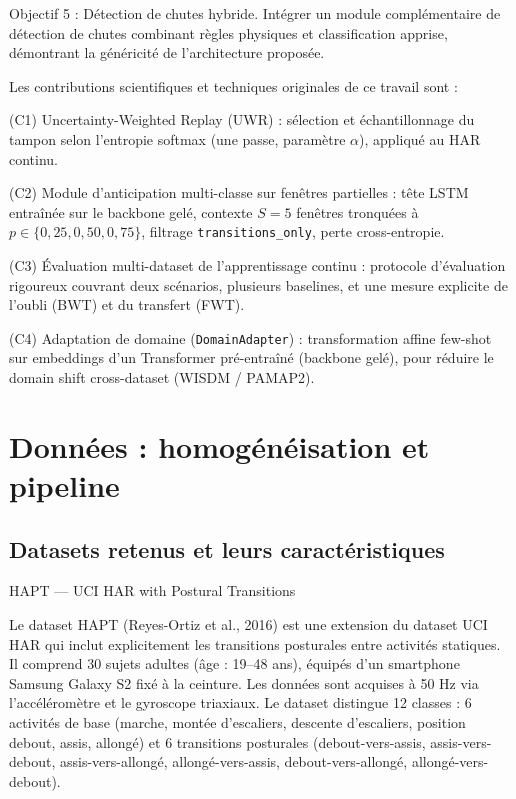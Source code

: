 \documentclass[a4paper,12pt]{report}
\begin{document}
Objectif 5 : Détection de chutes hybride. Intégrer un module complémentaire de détection de chutes combinant règles physiques et classification apprise, démontrant la généricité de l'architecture proposée.

Les contributions scientifiques et techniques originales de ce travail sont :

(C1) Uncertainty-Weighted Replay (UWR) : sélection et échantillonnage du
tampon selon l'entropie softmax (une passe, paramètre $\alpha$), appliqué
au HAR continu.

(C2) Module d'anticipation multi-classe sur fenêtres partielles : tête LSTM
entraînée sur le backbone gelé, contexte $S=5$ fenêtres tronquées à
$p\in\{0{,}25,0{,}50,0{,}75\}$, filtrage \texttt{transitions\_only}, perte
cross-entropie.

(C3) Évaluation multi-dataset de l'apprentissage continu : protocole d'évaluation rigoureux couvrant deux scénarios, plusieurs baselines, et une mesure explicite de l'oubli (BWT) et du transfert (FWT).

(C4) Adaptation de domaine (\texttt{DomainAdapter}) : transformation affine few-shot sur embeddings d'un Transformer pré-entraîné (backbone gelé), pour réduire le domain shift cross-dataset (WISDM / PAMAP2).

\section{Données : homogénéisation et pipeline}

\subsection{Datasets retenus et leurs caractéristiques}

HAPT — UCI HAR with Postural Transitions

Le dataset HAPT (Reyes-Ortiz et al., 2016) est une extension du dataset UCI HAR qui inclut explicitement les transitions posturales entre activités statiques. Il comprend 30 sujets adultes (âge : 19–48 ans), équipés d'un smartphone Samsung Galaxy S2 fixé à la ceinture. Les données sont acquises à 50 Hz via l'accéléromètre et le gyroscope triaxiaux. Le dataset distingue 12 classes : 6 activités de base (marche, montée d'escaliers, descente d'escaliers, position debout, assis, allongé) et 6 transitions posturales (debout-vers-assis, assis-vers-debout, assis-vers-allongé, allongé-vers-assis, debout-vers-allongé, allongé-vers-debout).
\end{document}
